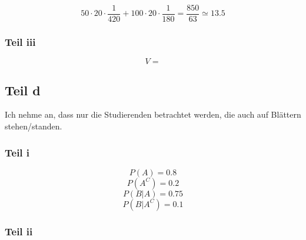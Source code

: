 \documentclass[10pt,a4paper]{article}
\begin{document}
\begin{equation}
  50 \cdot 20 \cdot \frac{1}{420} + 100 \cdot 20 \cdot \frac{1}{180} = \frac{850}{63} \simeq 13.5
\end{equation}

\subsubsection{Teil iii}

\begin{equation}
  V =
\end{equation}

\subsection{Teil d}

Ich nehme an, dass nur die Studierenden betrachtet werden, die auch auf Blättern stehen/standen.

\subsubsection{Teil i}

\begin{equation}
  P(A) = 0.8
\end{equation}
\begin{equation}
  P(A^{C}) = 0.2
\end{equation}
\begin{equation}
  P(B | A) = 0.75
\end{equation}
\begin{equation}
  P(B | A^{C}) = 0.1
\end{equation}

\subsubsection{Teil ii}
\end{document}
